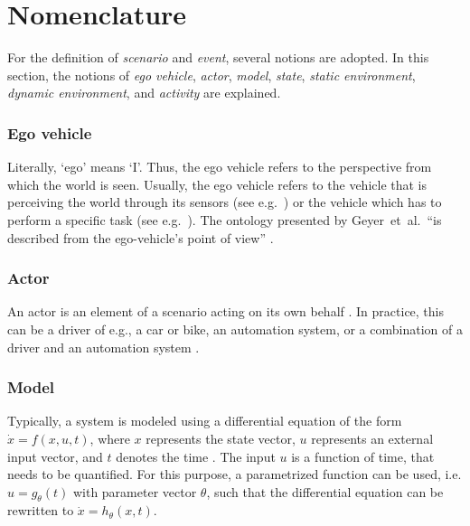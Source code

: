 \section{Nomenclature}
\label{sec:nomenclature}

For the definition of \emph{scenario} and \emph{event}, several notions are adopted. In this section, the notions of \emph{ego vehicle}, \emph{actor}, \emph{model}, \emph{state}, \emph{static environment}, \emph{dynamic environment}, and \emph{activity} are explained. 

\subsubsection{Ego vehicle}
\label{sec:ego vehicle}
Literally, `ego' means `I'. Thus, the ego vehicle refers to the perspective from which the world is seen. Usually, the ego vehicle refers to the vehicle that is perceiving the world through its sensors (see e.g.~\cite{Bonnin2014}) or the vehicle which has to perform a specific task (see e.g.~\cite{althoff2017CommonRoad}). The ontology presented by Geyer~et~al.\ ``is described from the ego-vehicle's point of view'' \cite{geyer2014}.  

\subsubsection{Actor}
\label{sec:actor}
An actor is an element of a scenario acting on its own behalf \cite{ulbrich2015}. In practice, this can be a driver of e.g., a car or bike, an automation system, or a combination of a driver and an automation system \cite{geyer2014}.

\subsubsection{Model}
\label{sec:model}
Typically, a system is modeled using a differential equation of the form $\dot{x}=f(x,u,t)$, where $x$ represents the state vector, $u$ represents an external input vector, and $t$ denotes the time \cite{norman2011control}. The input $u$ is a function of time, that needs to be quantified. For this purpose, a parametrized function can be used, i.e. $u=g_{\theta}(t)$ with parameter vector $\theta$, such that the differential equation can be rewritten to $\dot{x}=h_{\theta}(x,t)$.

